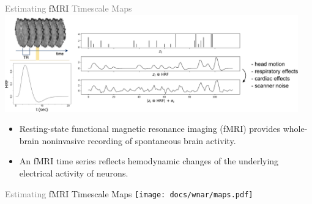\documentclass[8pt,aspectratio=169]{beamer}
\begin{document}
\begin{frame}{\textcolor{gray}{Estimating} fMRI \textcolor{gray}{Timescale Maps}}
     \centering\includegraphics[width=0.95\textwidth]{docs/wnar/fmri.pdf}
     \vfill
     \begin{itemize}
         \item Resting-state functional magnetic resonance imaging (fMRI) provides whole-brain noninvasive recording of spontaneous brain activity.
         \item An fMRI time series reflects hemodynamic changes of the underlying electrical activity of neurons.
     \end{itemize}
\end{frame}

\begin{frame}{\textcolor{gray}{Estimating} fMRI Timescale Maps}
    \vspace{5mm}
    \centering\texttt{[image: docs/wnar/maps.pdf]}
\end{frame}
\end{document}
